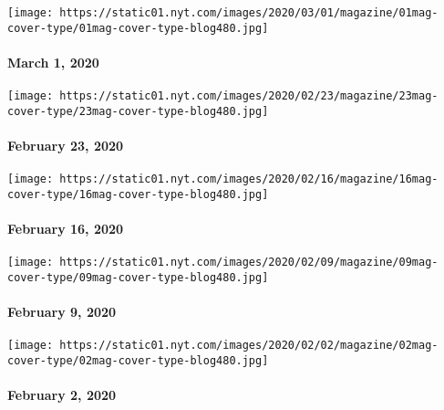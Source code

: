 \href{https://www.nytimes.com/issue/magazine/2020/02/27/the-3120-issue}{}

\texttt{[image: https://static01.nyt.com/images/2020/03/01/magazine/01mag-cover-type/01mag-cover-type-blog480.jpg]}

\hypertarget{march-1-2020}{%
\paragraph{March 1, 2020}\label{march-1-2020}}

\href{https://www.nytimes.com/issue/magazine/2020/02/20/the-22320-issue}{}

\texttt{[image: https://static01.nyt.com/images/2020/02/23/magazine/23mag-cover-type/23mag-cover-type-blog480.jpg]}

\hypertarget{february-23-2020}{%
\paragraph{February 23, 2020}\label{february-23-2020}}

\href{https://www.nytimes.com/issue/magazine/2020/02/13/the-21620-issue}{}

\texttt{[image: https://static01.nyt.com/images/2020/02/16/magazine/16mag-cover-type/16mag-cover-type-blog480.jpg]}

\hypertarget{february-16-2020}{%
\paragraph{February 16, 2020}\label{february-16-2020}}

\href{https://www.nytimes.com/issue/magazine/2020/02/06/the-2920-issue}{}

\texttt{[image: https://static01.nyt.com/images/2020/02/09/magazine/09mag-cover-type/09mag-cover-type-blog480.jpg]}

\hypertarget{february-9-2020}{%
\paragraph{February 9, 2020}\label{february-9-2020}}

\href{https://www.nytimes.com/issue/magazine/2020/01/30/the-2220-issue}{}

\texttt{[image: https://static01.nyt.com/images/2020/02/02/magazine/02mag-cover-type/02mag-cover-type-blog480.jpg]}

\hypertarget{february-2-2020}{%
\paragraph{February 2, 2020}\label{february-2-2020}}


